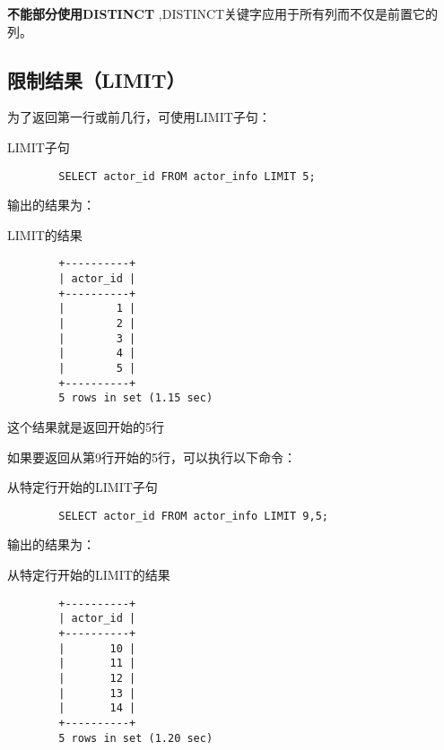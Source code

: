 \documentclass[UTF8]{article}
\begin{document}
\begin{orangebox}[frametitle={Tips 4.4}]
    \textbf {不能部分使用DISTINCT} ,DISTINCT关键字应用于所有列而不仅是前置它的列。
\end{orangebox}

\subsection{限制结果（LIMIT）}

为了返回第一行或前几行，可使用LIMIT子句：
\begin{listing}[H]
	\caption{LIMIT子句}
	\label{code:limitresult}
	\begin{verbatim}
        SELECT actor_id FROM actor_info LIMIT 5;
    \end{verbatim}
\end{listing}

输出的结果为：

\begin{listing}[H]
	\caption{LIMIT的结果}
	\label{code:resultlimitresult}
	\begin{verbatim}
        +----------+
        | actor_id |
        +----------+
        |        1 |
        |        2 |
        |        3 |
        |        4 |
        |        5 |
        +----------+
        5 rows in set (1.15 sec)
\end{verbatim}
\end{listing}
这个结果就是返回开始的5行

如果要返回从第9行开始的5行，可以执行以下命令：
\begin{listing}[H]
	\caption{从特定行开始的LIMIT子句}
	\label{code:distinctlimitresult}
	\begin{verbatim}
        SELECT actor_id FROM actor_info LIMIT 9,5;
    \end{verbatim}
\end{listing}

输出的结果为：

\begin{listing}[H]
	\caption{从特定行开始的LIMIT的结果}
	\label{code:resultdistinctlimitresult}
	\begin{verbatim}
        +----------+
        | actor_id |
        +----------+
        |       10 |
        |       11 |
        |       12 |
        |       13 |
        |       14 |
        +----------+
        5 rows in set (1.20 sec)
\end{verbatim}
\end{listing}
\end{document}
